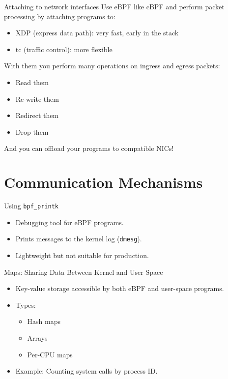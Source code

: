 \documentclass{beamer}
\begin{document}
\begin{frame}{Attaching to network interfaces}
    Use eBPF like cBPF and perform packet processing by attaching programs to:
    \begin{itemize}
        \item XDP (express data path): very fast, early in the stack
        \item tc (traffic control): more flexible
    \end{itemize}
    With them you perform many operations on ingress and egress packets:
    \begin{itemize}
        \item Read them
        \item Re-write them
        \item Redirect them
        \item Drop them
    \end{itemize}

    And you can offload your programs to compatible NICs!
\end{frame}

\section{Communication Mechanisms}
\begin{frame}{Using \texttt{bpf\_printk}}
    \begin{itemize}
        \item Debugging tool for eBPF programs.
        \item Prints messages to the kernel log (\texttt{dmesg}).
        \item Lightweight but not suitable for production.
    \end{itemize}
\end{frame}

\begin{frame}{Maps: Sharing Data Between Kernel and User Space}
    \begin{itemize}
        \item Key-value storage accessible by both eBPF and user-space programs.
        \item Types:
        \begin{itemize}
            \item Hash maps
            \item Arrays
            \item Per-CPU maps
        \end{itemize}
        \item Example: Counting system calls by process ID.
    \end{itemize}
\end{frame}
\end{document}
